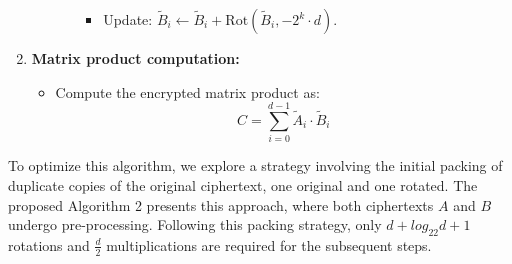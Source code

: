 \documentclass[article]{iacrtrans}
\begin{document}
\begin{enumerate}
\begin{itemize}
\begin{enumerate}
                        \begin{itemize}
                            \item Update: $\tilde{B}_i \gets \tilde{B}_i + \mathrm{Rot}(\tilde{B}_i, -2^k \cdot d)$.
                        \end{itemize}
                \end{enumerate}
        \end{itemize}
    \item \textbf{Matrix product computation:}
        \begin{itemize}
            \item Compute the encrypted matrix product as:
            \[
                C = \sum_{i=0}^{d-1} \tilde{A}_i \cdot \tilde{B}_i
            \]
        \end{itemize}
\end{enumerate}


To optimize this algorithm, we explore a strategy involving the initial packing of duplicate copies of the original ciphertext, one original and one rotated. The proposed Algorithm 2 presents this approach, where both ciphertexts $A$ and $B$ undergo pre-processing. Following this packing strategy, only $d +log_22d+1 $rotations and $\frac{d}{2}$ multiplications are required for the subsequent steps.
\end{document}

